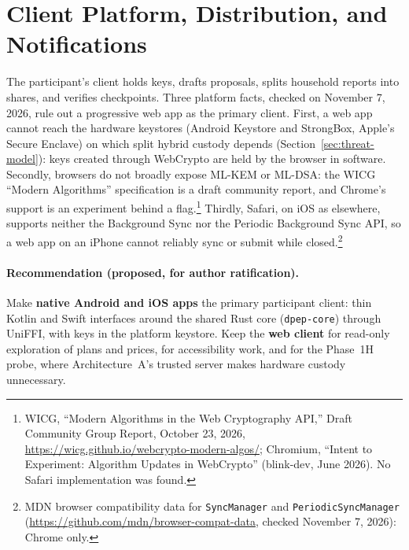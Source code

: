 \documentclass[10pt,twoside,openany]{book}
\theoremstyle{dpepstyle}
\begin{document}
\section{Client Platform, Distribution, and Notifications}
\label{sec:clients}

The participant's client holds keys, drafts proposals, splits household reports into shares, and verifies checkpoints. Three platform facts, checked on November 7, 2026, rule out a progressive web app as the primary client. First, a web app cannot reach the hardware keystores (Android Keystore and StrongBox, Apple's Secure Enclave) on which split hybrid custody depends (Section~\ref{sec:threat-model}): keys created through WebCrypto are held by the browser in software. Secondly, browsers do not broadly expose ML-KEM or ML-DSA: the WICG ``Modern Algorithms'' specification is a draft community report, and Chrome's support is an experiment behind a flag.\footnote{WICG, ``Modern Algorithms in the Web Cryptography API,'' Draft Community Group Report, October 23, 2026, \url{https://wicg.github.io/webcrypto-modern-algos/}; Chromium, ``Intent to Experiment: Algorithm Updates in WebCrypto'' (blink-dev, June 2026). No Safari implementation was found.} Thirdly, Safari, on iOS as elsewhere, supports neither the Background Sync nor the Periodic Background Sync API, so a web app on an iPhone cannot reliably sync or submit while closed.\footnote{MDN browser compatibility data for \texttt{SyncManager} and \texttt{PeriodicSyncManager} (\url{https://github.com/mdn/browser-compat-data}, checked November 7, 2026): Chrome only.}

\paragraph{Recommendation (proposed, for author ratification).} Make \textbf{native Android and iOS apps} the primary participant client: thin Kotlin and Swift interfaces around the shared Rust core (\texttt{dpep-core}) through UniFFI, with keys in the platform keystore. Keep the \textbf{web client} for read-only exploration of plans and prices, for accessibility work, and for the Phase~1H probe, where Architecture~A's trusted server makes hardware custody unnecessary.
\end{document}
